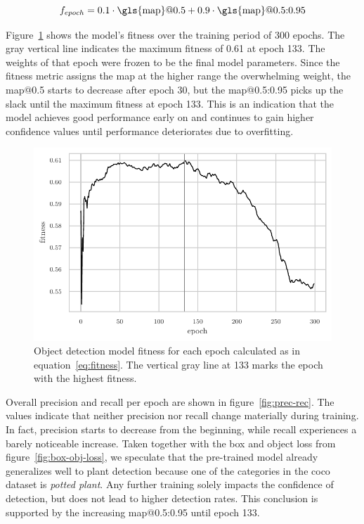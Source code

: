 \documentclass[draft,final]{vutinfth} %
\begin{document}
\begin{equation}
  \label{eq:fitness}
  f_{epoch} = 0.1 \cdot \mathrm{\gls{map}}@0.5 + 0.9 \cdot \mathrm{\gls{map}}@0.5\mathrm{:}0.95
\end{equation}

Figure~\ref{fig:fitness} shows the model's fitness over the training
period of \num{300} epochs. The gray vertical line indicates the
maximum fitness of \num{0.61} at epoch \num{133}. The weights of that
epoch were frozen to be the final model parameters. Since the fitness
metric assigns the \gls{map} at the higher range the overwhelming
weight, the \gls{map}@0.5 starts to decrease after epoch \num{30}, but
the \gls{map}@0.5:0.95 picks up the slack until the maximum fitness at
epoch \num{133}. This is an indication that the model achieves good
performance early on and continues to gain higher confidence values
until performance deteriorates due to overfitting.

\begin{figure}
  \centering
  \includegraphics{graphics/model_fitness.pdf}
  \caption[Object detection fitness per epoch.]{Object detection model
    fitness for each epoch calculated as in
    equation~\ref{eq:fitness}. The vertical gray line at \num{133}
    marks the epoch with the highest fitness.}
  \label{fig:fitness}
\end{figure}

Overall precision and recall per epoch are shown in
figure~\ref{fig:prec-rec}. The values indicate that neither precision
nor recall change materially during training. In fact, precision
starts to decrease from the beginning, while recall experiences a
barely noticeable increase. Taken together with the box and object
loss from figure~\ref{fig:box-obj-loss}, we speculate that the
pre-trained model already generalizes well to plant detection because
one of the categories in the \gls{coco} \cite{lin2015} dataset is
\emph{potted plant}. Any further training solely impacts the
confidence of detection, but does not lead to higher detection
rates. This conclusion is supported by the increasing
\gls{map}@0.5:0.95 until epoch \num{133}.
\end{document}
